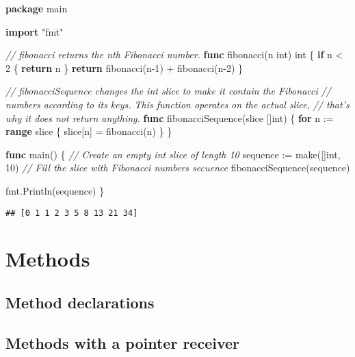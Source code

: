\documentclass[]{book}
\newenvironment{Shaded}{\begin{snugshade}}{\end{snugshade}}
\newcommand{\BuiltInTok}[1]{#1}
\newcommand{\CommentTok}[1]{\textcolor[rgb]{0.56,0.35,0.01}{\textit{#1}}}
\newcommand{\DataTypeTok}[1]{\textcolor[rgb]{0.13,0.29,0.53}{#1}}
\newcommand{\DecValTok}[1]{\textcolor[rgb]{0.00,0.00,0.81}{#1}}
\newcommand{\KeywordTok}[1]{\textcolor[rgb]{0.13,0.29,0.53}{\textbf{#1}}}
\newcommand{\NormalTok}[1]{#1}
\newcommand{\StringTok}[1]{\textcolor[rgb]{0.31,0.60,0.02}{#1}}
\begin{document}
\begin{Shaded}
\begin{Highlighting}[]
\KeywordTok{package}\NormalTok{ main}

\KeywordTok{import} \StringTok{"fmt"}

\CommentTok{// fibonacci returns the nth Fibonacci number.}
\KeywordTok{func}\NormalTok{ fibonacci(n }\DataTypeTok{int}\NormalTok{) }\DataTypeTok{int}\NormalTok{ \{}
    \KeywordTok{if}\NormalTok{ n < }\DecValTok{2}\NormalTok{ \{}
        \KeywordTok{return}\NormalTok{ n}
\NormalTok{    \}}
    \KeywordTok{return}\NormalTok{ fibonacci(n}\DecValTok{-1}\NormalTok{) + fibonacci(n}\DecValTok{-2}\NormalTok{)}
\NormalTok{\}}

\CommentTok{// fibonacciSequence changes the int slice to make it contain the Fibonacci}
\CommentTok{// numbers according to its keys. This function operates on the actual slice,}
\CommentTok{// that's why it does not return anything.}
\KeywordTok{func}\NormalTok{ fibonacciSequence(slice []}\DataTypeTok{int}\NormalTok{) \{}
    \KeywordTok{for}\NormalTok{ n := }\KeywordTok{range}\NormalTok{ slice \{}
\NormalTok{        slice[n] = fibonacci(n)}
\NormalTok{    \}}
\NormalTok{\}}

\KeywordTok{func}\NormalTok{ main() \{}
    \CommentTok{// Create an empty int slice of length 10}
\NormalTok{    sequence := }\BuiltInTok{make}\NormalTok{([]}\DataTypeTok{int}\NormalTok{, }\DecValTok{10}\NormalTok{)}
    \CommentTok{// Fill the slice with Fibonacci numbers secuence}
\NormalTok{    fibonacciSequence(sequence)}

\NormalTok{    fmt.Println(sequence)}
\NormalTok{\}}
\end{Highlighting}
\end{Shaded}

\begin{verbatim}
## [0 1 1 2 3 5 8 13 21 34]
\end{verbatim}

\hypertarget{methods}{%
\chapter{Methods}\label{methods}}

\hypertarget{method-declarations}{%
\section{Method declarations}\label{method-declarations}}

\hypertarget{methods-with-a-pointer-receiver}{%
\section{Methods with a pointer receiver}\label{methods-with-a-pointer-receiver}}
\end{document}
